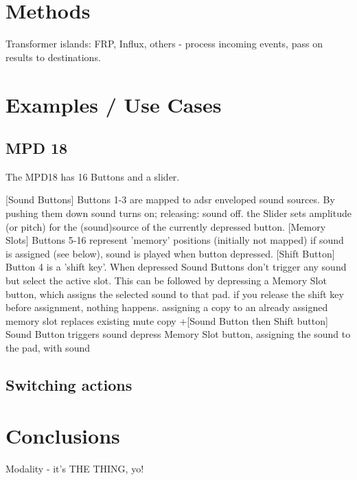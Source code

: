 \documentclass{article}
\begin{document}
\section{Methods}
\label{sec:methods}

Transformer islands: 
		FRP, Influx, others 
		- process incoming events, pass on results to destinations.

\section{Examples / Use Cases}
\label{sec:examples_use_cases}




\subsection{MPD 18}
\label{sub:mpd_18}

The MPD18 has 16 Buttons and a slider.

    [Sound Buttons] Buttons 1-3 are mapped to adsr enveloped sound sources.
        By pushing them down sound turns on; releasing: sound off.
    the Slider sets amplitude (or pitch) for the (sound)source of the currently depressed button.
    [Memory Slots] Buttons 5-16 represent 'memory' positions (initially not mapped)
        if sound is assigned (see below), sound is played when button depressed.
    [Shift Button] Button 4 is a 'shift key'. When depressed
        Sound Buttons don't trigger any sound but select the active slot. This can be followed by
        depressing a Memory Slot button, which assigns the selected sound to that pad.
        if you release the shift key before assignment, nothing happens.
        assigning a copy to an already assigned memory slot replaces existing
        mute copy +[Sound Button then Shift button]
        Sound Button triggers sound
        depress Memory Slot button, assigning the sound to the pad, with sound

\subsection{Switching actions}
\label{sub:switching_actions}




\section{Conclusions}
\label{sec:conclusions}


Modality - it's THE THING, yo!
\end{document}
